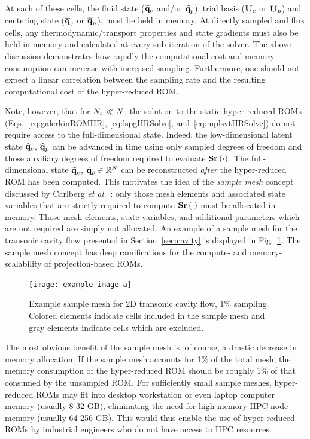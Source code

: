 At each of these cells, the fluid state ($\mathbf{\widetilde{q}}_{c}$ and/or $\mathbf{\widetilde{q}}_{p}$), trial basis ($\consTrial$ or $\primTrial$) and centering state ($\mathbf{\overline{q}}_{c}$ or $\mathbf{\overline{q}}_{p}$), must be held in memory. At directly sampled and flux cells, any thermodynamic/transport properties and state gradients must also be held in memory and calculated at every sub-iteration of the solver. The above discussion demonstrates how rapidly the computational cost and memory consumption can increase with increased sampling. Furthermore, one should not expect a linear correlation between the sampling rate and the resulting computational cost of the hyper-reduced ROM.

Note, however, that for $N_s \ll N$, the solution to the static hyper-reduced ROMs (Eqs.~\ref{eq:galerkinROMHR}, \ref{eq:lspgHRSolve}, and~\ref{eq:mplsvtHRSolve}) do not require access to the full-dimensional state. Indeed, the low-dimensional latent state $\mathbf{\widehat{q}}_{c}$, $\mathbf{\widehat{q}}_{p}$ can be advanced in time using only sampled degrees of freedom and those auxiliary degrees of freedom required to evaluate $\mathbf{S} \mathbf{r}\left(\cdot\right)$. The full-dimensional state $\mathbf{\widetilde{q}}_{c}$, $\mathbf{\widetilde{q}}_{p} \in \mathbb{R}^{N}$ can be reconstructed \textit{after} the hyper-reduced ROM has been computed. This motivates the idea of the \textit{sample mesh} concept discussed by Carlberg \textit{et al.}~\cite{Carlberg2013}: only those mesh elements and associated state variables that are strictly required to compute $\mathbf{S} \mathbf{r}\left(\cdot\right)$ must be allocated in memory. Those mesh elements, state variables, and additional parameters which are not required are simply not allocated. An example of a sample mesh for the transonic cavity flow presented in Section~\ref{sec:cavity} is displayed in Fig.~\ref{fig:sampMeshExample}. The sample mesh concept has deep ramifications for the compute- and memory-scalability of projection-based ROMs.

\begin{figure}
	\centering
	\texttt{[image: example-image-a]}
	\caption{\label{fig:sampMeshExample}Example sample mesh for 2D transonic cavity flow, 1\% sampling. Colored elements indicate cells included in the sample mesh and gray elements indicate cells which are excluded.}
\end{figure}

The most obvious benefit of the sample mesh is, of course, a drastic decrease in memory allocation. If the sample mesh accounts for 1\% of the total mesh, the memory consumption of the hyper-reduced ROM should be roughly 1\% of that consumed by the unsampled ROM. For sufficiently small sample meshes, hyper-reduced ROMs may fit into desktop workstation or even laptop computer memory (usually 8-32 GB), eliminating the need for high-memory HPC node memory (usually 64-256 GB). This would thus enable the use of hyper-reduced ROMs by industrial engineers who do not have access to HPC resources.

